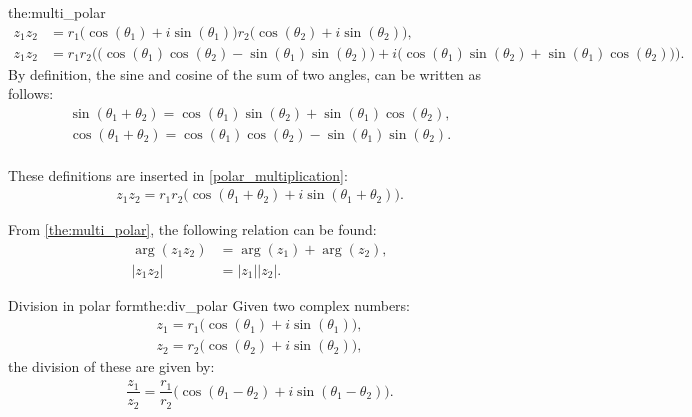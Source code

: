 \begin{prof}{}{the:multi_polar}
\begin{align}
z_1 z_2&=r_1 \big( \cos(\theta_1)+ i \sin(\theta_1)\big)r_2 \big( \cos(\theta_2)+ i \sin(\theta_2)\big), \nonumber
\\
\label{polar_multiplication}
z_1z_2&=r_1r_2\Big( \big(\cos(\theta_1)\cos(\theta_2)-\sin(\theta_1) \sin(\theta_2)\big)+i\big(\cos(\theta_1)\sin(\theta_2)+\sin(\theta_1)\cos(\theta_2)\big)\Big).
\end{align}
By definition, the sine and cosine of the sum of two angles, can be written as follows: \cite[p. A-14 Appendicies]{calc}
\\
\begin{align} 
\sin(\theta_1+\theta_2)=\cos(\theta_1)\sin(\theta_2)+\sin(\theta_1)\cos(\theta_2), \label{sum_cos_sin}
\end{align}
\begin{align*}
\cos(\theta_1+\theta_2)=\cos(\theta_1)\cos(\theta_2)-\sin(\theta_1)\sin(\theta_2).
\end{align*}
\\
These definitions are inserted in \eqref{polar_multiplication}:
\\
\begin{align*}
z_1 z_2=r_1r_2\big( \cos(\theta_1+\theta_2)+ i \sin(\theta_1+\theta_2)\big).
\end{align*}
\end{prof}
\noindent
From  \eqref{the:multi_polar}, the following relation can be found:
\begin{align}
\arg(z_1z_2)&=\arg(z_1)+\arg(z_2),
\\
|z_1z_2|&=|z_1||z_2|.
\end{align}

\begin{theorem}{Division in polar form}{the:div_polar}
Given two complex numbers:
\begin{align*}
z_1=r_1\big(\cos(\theta_1)+i\sin(\theta_1)\big), 
\\
z_2=r_2\big(\cos(\theta_2)+i\sin(\theta_2)\big),
\end{align*}
the division of these are given by:
\begin{align*}
\dfrac{z_1}{z_2}=\dfrac{r_1}{r_2}\Big( \cos(\theta_1-\theta_2)+ i \sin(\theta_1-\theta_2)\Big).
\end{align*}
\end{theorem}


